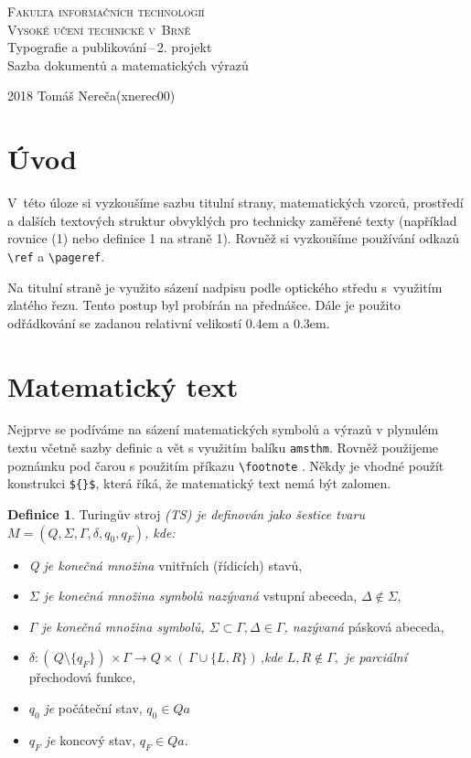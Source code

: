 \documentclass[a4paper, 11pt, twocolumn]{article}
\theoremstyle{definition}
\newtheorem{definition}{Definice}
\theoremstyle{definition}
\begin{document}
\begin{titlepage}
\begin{center}
	
	\textsc{\Huge Fakulta informačních technologií\\[3.5mm]
			Vysoké učení technické v~Brně}
	\\[79mm]
	{\LARGE Typografie a publikování\,--\,2. projekt\\[1.5mm]
	Sazba dokumentů a matematických výrazů}
	\vfill
\end{center}
{\Large 2018 \hfill Tomáš Nereča(xnerec00)}
\\[-4mm]
\end{titlepage}

\section*{Úvod}
V~této úloze si vyzkoušíme sazbu titulní strany, matematických vzorců, prostředí a dalších textových struktur obvyklých pro technicky zaměřené texty (například rovnice (1) nebo definice 1 na straně 1). Rovněž si vyzkoušíme používání odkazů \verb|\ref| a \verb|\pageref|.

Na titulní straně je využito sázení nadpisu podle optického středu s~využitím zlatého řezu. Tento postup byl probírán na přednášce. Dále je použito odřádkování se
zadanou relativní velikostí 0.4em a 0.3em.

\section{Matematický text}
Nejprve se podíváme na sázení matematických symbolů a výrazů v plynulém textu včetně sazby definic a vět s využitím balíku \verb|amsthm|. Rovněž použijeme poznámku pod čarou s použitím příkazu \verb|\footnote| . Někdy je vhodné použít konstrukci \verb|${}$|, která říká, že matematický text nemá být zalomen.

\begin{definition}
\label{definice_1}
Turingův stroj \emph{(TS) je definován jako šestice tvaru $M=(Q,\Sigma,\Gamma,\delta, q_0, q_F)$, kde:}

\begin{itemize}
\item \emph{Q je konečná množina} vnitřních (řídicích) stavů,
\item \emph{$\Sigma$ je konečná množina symbolů nazývaná} vstupní abeceda, $\Delta \not\in \Sigma$,
\item \emph{ $\Gamma$ je konečná množina symbolů, $\Sigma \subset \Gamma, \Delta\in \Gamma$, nazývaná} pásková abeceda,
\item $\delta\!:\!( \,Q\setminus\{q_F\})\,\!\times\Gamma \longrightarrow Q\times( \,\Gamma\cup\{L,R\}) \,$,\emph{kde} $ L,R \not\in\Gamma,$ \emph{je parciální} přechodová funkce,
\item $q_0$ \emph{je} počáteční stav, $q_0\in Qa$
\item $q_F$ \emph{je} koncový stav, $q_F\in Qa$.
\end{itemize}
\end{definition}
\end{document}
